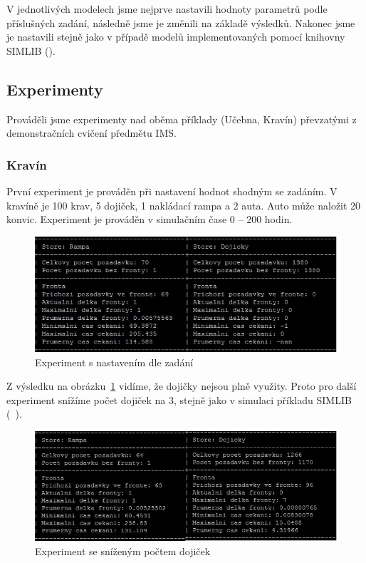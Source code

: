\documentclass[12pt,a4paper,titlepage,final]{article}
\begin{document}
V jednotlivých modelech jsme nejprve nastavili hodnoty parametrů podle příslušných zadání, následně jsme je změnili na základě výsledků. Nakonec jsme je nastavili stejně jako v případě modelů implementovaných pomocí knihovny SIMLIB (\cite{priklady}).

\subsection{Experimenty}

Prováděli jsme experimenty nad oběma příklady (Učebna, Kravín) převzatými z demonstračních cvičení předmětu IMS.

\subsubsection{ Kravín}

První experiment je prováděn při nastavení hodnot shodným se zadáním. V kravíně je 100 krav, 5 dojiček, 1 nakládací rampa a 2 auta. Auto může naložit 20 konvic. Experiment je prováděn v simulačním čase 0 -- 200 hodin.

\begin{figure}[!h] 
 	\centering
	 \includegraphics[]{kravy1.jpg}
\caption{Experiment s nastavením dle zadání}
\label{obr1}
\end{figure}

Z výsledku na obrázku~\ref{obr1} vidíme, že dojičky nejsou plně využity. Proto pro další experiment snížíme počet dojiček na 3, stejně jako v simulaci příkladu  SIMLIB (~\cite{priklady}).

\begin{figure}[!h] 
 	\centering
	 \includegraphics[]{kravy2.jpg}
\caption{Experiment se sníženým počtem dojiček}
\label{obr2}
\end{figure}
\end{document}
